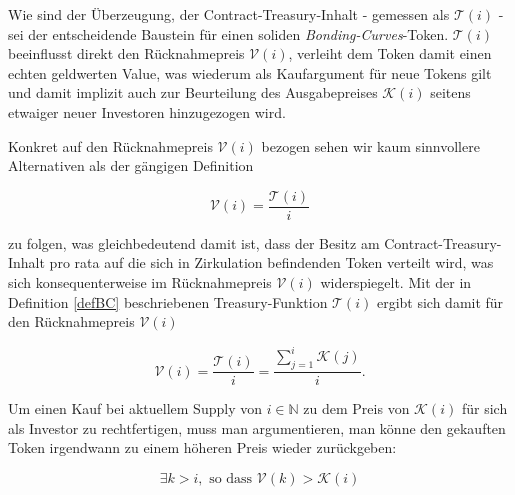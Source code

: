 \begin{Fazit}

Wie sind der Überzeugung, der Contract-Treasury-Inhalt - gemessen als $\mathcal{T} \left( i \right)$ - sei der entscheidende Baustein für einen soliden \textit{Bonding-Curves}-Token. $\mathcal{T} \left( i \right)$ beeinflusst direkt den Rücknahmepreis $\mathcal{V} \left( i \right)$, verleiht dem Token damit einen echten geldwerten Value, was wiederum als Kaufargument für neue Tokens gilt und damit implizit auch zur Beurteilung des Ausgabepreises $\mathcal{K} \left( i \right)$ seitens etwaiger neuer Investoren hinzugezogen wird.

\vspace{0.2cm}

Konkret auf den Rücknahmepreis $\mathcal{V} \left( i \right)$ bezogen sehen wir kaum sinnvollere Alternativen als der gängigen Definition 

\begin{equation*}
\mathcal{V} \left( i \right) = \frac{\mathcal{T} \left( i \right)}{i}
\end{equation*}

zu folgen, was gleichbedeutend damit ist, dass der Besitz am Contract-Treasury-Inhalt pro rata auf die sich in Zirkulation befindenden Token verteilt wird, was sich konsequenterweise im Rücknahmepreis $\mathcal{V} \left( i \right)$ widerspiegelt. Mit der in Definition \ref{defBC} beschriebenen Treasury-Funktion $\mathcal{T} \left( i \right)$ ergibt sich damit für den Rücknahmepreis $\mathcal{V} \left( i \right)$

\begin{equation*}
\mathcal{V} \left( i \right) = \frac{\mathcal{T} \left( i \right)}{i} = \frac{\sum_{j = 1}^{i} \mathcal{K} \left( j \right)}{i}.
\end{equation*} 

\vspace{0.2cm}

Um einen Kauf bei aktuellem Supply von $i \in \mathbb{N}$ zu dem Preis von $\mathcal{K} \left( i \right)$ für sich als Investor zu rechtfertigen, muss man argumentieren, man könne den gekauften Token irgendwann zu einem höheren Preis wieder zurückgeben:

\begin{equation*}
\exists k > i, \textrm{  so dass } \mathcal{V} \left( k \right) > \mathcal{K} \left( i \right)
\end{equation*} 


\end{Fazit}
